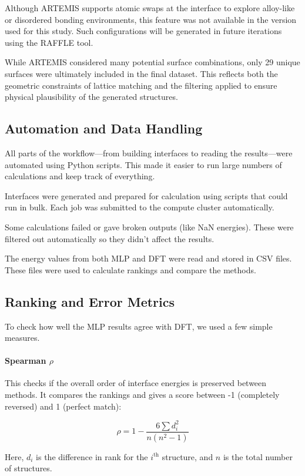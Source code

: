 Although ARTEMIS supports atomic swaps at the interface to explore alloy-like or disordered bonding environments, this feature was not available in the version used for this study. Such configurations will be generated in future iterations using the RAFFLE tool.

While ARTEMIS considered many potential surface combinations, only 29 unique surfaces were ultimately included in the final dataset. This reflects both the geometric constraints of lattice matching and the filtering applied to ensure physical plausibility of the generated structures.

\subsection{Automation and Data Handling}

All parts of the workflow—from building interfaces to reading the results—were automated using Python scripts. This made it easier to run large numbers of calculations and keep track of everything.

Interfaces were generated and prepared for calculation using scripts that could run in bulk. Each job was submitted to the compute cluster automatically.

Some calculations failed or gave broken outputs (like NaN energies). These were filtered out automatically so they didn’t affect the results.

The energy values from both MLP and DFT were read and stored in CSV files. These files were used to calculate rankings and compare the methods.

\subsection{Ranking and Error Metrics}

To check how well the MLP results agree with DFT, we used a few simple measures.

\paragraph{Spearman \( \rho \)}

This checks if the overall order of interface energies is preserved between methods. It compares the rankings and gives a score between -1 (completely reversed) and 1 (perfect match):

\[
\rho = 1 - \frac{6 \sum d_i^2}{n(n^2 - 1)}
\]

Here, \( d_i \) is the difference in rank for the \( i^\text{th} \) structure, and \( n \) is the total number of structures.

